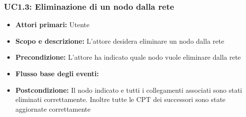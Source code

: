 \subsubsection{UC1.3: Eliminazione di un nodo dalla rete} 
\begin{itemize} 
	\item{\textbf{Attori primari:} Utente} 
	\item{\textbf{Scopo e descrizione:} L'attore desidera eliminare un nodo dalla rete} 
	\item{\textbf{Precondizione:} L'attore ha indicato quale nodo vuole eliminare dalla rete} 
	\item{\textbf{Flusso base degli eventi:} } 			
	\item{\textbf{Postcondizione:} Il nodo indicato e tutti i collegamenti associati sono stati eliminati correttamente. Inoltre tutte le CPT dei successori sono state aggiornate correttamente} 
\end{itemize} 

